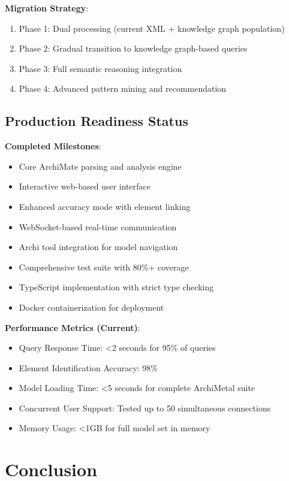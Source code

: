 \documentclass[12pt,a4paper]{article}
\begin{document}
\textbf{Migration Strategy}:
\begin{enumerate}
    \item Phase 1: Dual processing (current XML + knowledge graph population)
    \item Phase 2: Gradual transition to knowledge graph-based queries
    \item Phase 3: Full semantic reasoning integration
    \item Phase 4: Advanced pattern mining and recommendation
\end{enumerate}

\subsection{Production Readiness Status}

\textbf{Completed Milestones}:
\begin{itemize}
    \item[\ding{51}] Core ArchiMate parsing and analysis engine
    \item[\ding{51}] Interactive web-based user interface
    \item[\ding{51}] Enhanced accuracy mode with element linking
    \item[\ding{51}] WebSocket-based real-time communication
    \item[\ding{51}] Archi tool integration for model navigation
    \item[\ding{51}] Comprehensive test suite with 80\%+ coverage
    \item[\ding{51}] TypeScript implementation with strict type checking
    \item[\ding{51}] Docker containerization for deployment
\end{itemize}

\textbf{Performance Metrics (Current)}:
\begin{itemize}
    \item Query Response Time: <2 seconds for 95\% of queries
    \item Element Identification Accuracy: 98\%
    \item Model Loading Time: <5 seconds for complete ArchiMetal suite
    \item Concurrent User Support: Tested up to 50 simultaneous connections
    \item Memory Usage: <1GB for full model set in memory
\end{itemize}

\section{Conclusion}
\end{document}
